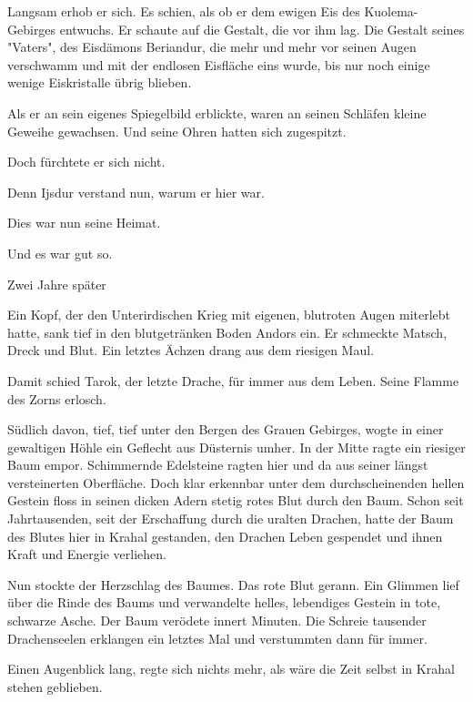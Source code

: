 Langsam erhob er sich. Es schien, als ob er dem ewigen Eis des Kuolema-Gebirges entwuchs. Er schaute auf die Gestalt, die vor ihm lag. Die Gestalt seines "Vaters", des Eisdämons Beriandur, die mehr und mehr vor seinen Augen verschwamm und mit der endlosen Eisfläche eins wurde, bis nur noch einige wenige Eiskristalle übrig blieben.

Als er an sein eigenes Spiegelbild erblickte, waren an seinen Schläfen kleine Geweihe gewachsen. Und seine Ohren hatten sich zugespitzt.

Doch fürchtete er sich nicht.

Denn Ijsdur verstand nun, warum er hier war.

Dies war nun seine Heimat.

Und es war gut so.\bigskip








Zwei Jahre später\bigskip



Ein Kopf, der den Unterirdischen Krieg mit eigenen, blutroten Augen miterlebt hatte, sank tief in den blutgetränken Boden Andors ein. Er schmeckte Matsch, Dreck und Blut. Ein letztes Ächzen drang aus dem riesigen Maul.

Damit schied Tarok, der letzte Drache, für immer aus dem Leben. Seine Flamme des Zorns erlosch.

Südlich davon, tief, tief unter den Bergen des Grauen Gebirges, wogte in einer gewaltigen Höhle ein Geflecht aus Düsternis umher. In der Mitte ragte ein riesiger Baum empor. Schimmernde Edelsteine ragten hier und da aus seiner längst versteinerten Oberfläche. Doch klar erkennbar unter dem durchscheinenden hellen Gestein floss in seinen dicken Adern stetig rotes Blut durch den Baum. Schon seit Jahrtausenden, seit der Erschaffung durch die uralten Drachen, hatte der Baum des Blutes hier in Krahal gestanden, den Drachen Leben gespendet und ihnen Kraft und Energie verliehen.

Nun stockte der Herzschlag des Baumes. Das rote Blut gerann. Ein Glimmen lief über die Rinde des Baums und verwandelte helles, lebendiges Gestein in tote, schwarze Asche. Der Baum verödete innert Minuten. Die Schreie tausender Drachenseelen erklangen ein letztes Mal und verstummten dann für immer.

Einen Augenblick lang, regte sich nichts mehr, als wäre die Zeit selbst in Krahal stehen geblieben.

